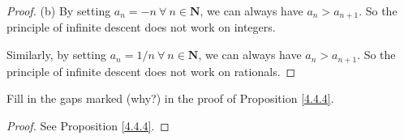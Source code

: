 \begin{proof}{(b)}
By setting \(a_n = -n \ \forall\ n \in \mathbf{N}\), we can always have \(a_n > a_{n + 1}\).
So the principle of infinite descent does not work on integers.

Similarly, by setting \(a_n = 1 / n \ \forall\ n \in \mathbf{N}\), we can always have \(a_n > a_{n + 1}\).
So the principle of infinite descent does not work on rationals.
\end{proof}

\begin{exercise}\label{ex 4.4.3}
Fill in the gaps marked (why?) in the proof of Proposition \ref{4.4.4}.
\end{exercise}

\begin{proof}
See Proposition \ref{4.4.4}.
\end{proof}